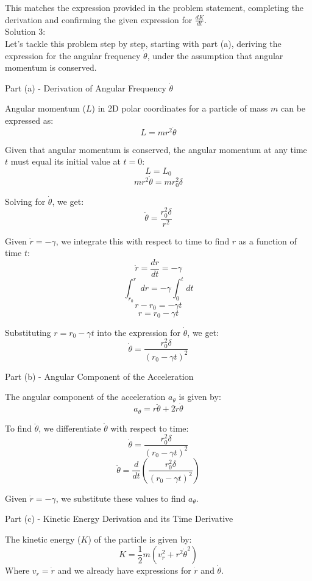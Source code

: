 \documentclass[a4paper,11pt]{article}
\begin{document}
This matches the expression provided in the problem statement, completing the derivation and confirming the given expression for \(\frac{dK}{dt}\). \\

\noindent Solution 3: \\

Let's tackle this problem step by step, starting with part (a), deriving the expression for the angular frequency \( \dot{\theta} \), under the assumption that angular momentum is conserved.

Part (a) - Derivation of Angular Frequency \( \dot{\theta} \)

Angular momentum (\( L \)) in 2D polar coordinates for a particle of mass \( m \) can be expressed as:
\[ L = m r^2 \dot{\theta} \]

Given that angular momentum is conserved, the angular momentum at any time \( t \) must equal its initial value at \( t = 0 \):
\[ L = L_0 \]
\[ m r^2 \dot{\theta} = m r_0^2 \delta \]

Solving for \( \dot{\theta} \), we get:
\[ \dot{\theta} = \frac{r_0^2 \delta}{r^2} \]

Given \( \dot{r} = - \gamma \), we integrate this with respect to time to find \( r \) as a function of time \( t \):
\[ \dot{r} = \frac{dr}{dt} = - \gamma \]
\[ \int_{r_0}^{r} dr = - \gamma \int_{0}^{t} dt \]
\[ r - r_0 = - \gamma t \]
\[ r = r_0 - \gamma t \]

Substituting \( r = r_0 - \gamma t \) into the expression for \( \dot{\theta} \), we get:
\[ \dot{\theta} = \frac{r_0^2 \delta}{(r_0 - \gamma t)^2} \]

Part (b) - Angular Component of the Acceleration

The angular component of the acceleration \( a_{\theta} \) is given by:
\[ a_{\theta} = r \ddot{\theta} + 2\dot{r}\dot{\theta} \]

To find \( \ddot{\theta} \), we differentiate \( \dot{\theta} \) with respect to time:
\[ \dot{\theta} = \frac{r_0^2 \delta}{(r_0 - \gamma t)^2} \]
\[ \ddot{\theta} = \frac{d}{dt}\left(\frac{r_0^2 \delta}{(r_0 - \gamma t)^2}\right) \]

Given \( \dot{r} = - \gamma \), we substitute these values to find \( a_{\theta} \).

Part (c) - Kinetic Energy Derivation and its Time Derivative

The kinetic energy (\( K \)) of the particle is given by:
\[ K = \frac{1}{2} m (v_r^2 + r^2 \dot{\theta}^2) \]
Where \( v_r = \dot{r} \) and we already have expressions for \( \dot{r} \) and \( \dot{\theta} \).
\end{document}

